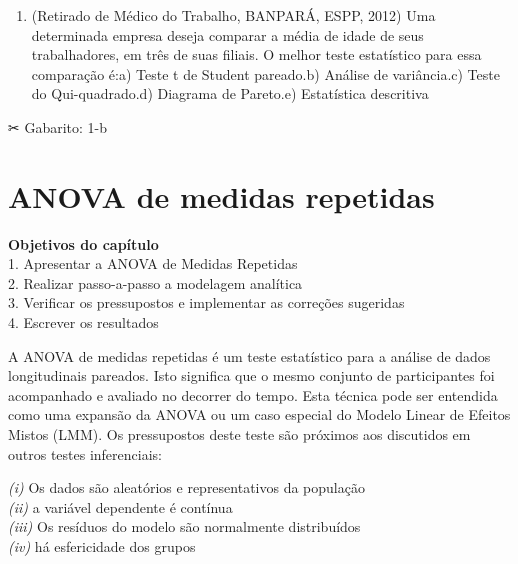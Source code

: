 \documentclass[
]{book}
\providecommand{\tightlist}{%
  \setlength{\itemsep}{0pt}\setlength{\parskip}{0pt}}
\begin{document}
\begin{question}

\begin{enumerate}
\def\labelenumi{\arabic{enumi}.}
\tightlist
\item
  (Retirado de Médico do Trabalho, BANPARÁ, ESPP, 2012) Uma determinada empresa deseja comparar a média de idade de seus trabalhadores, em três de suas filiais. O melhor teste estatístico para essa comparação é:a) Teste t de Student pareado.b) Análise de variância.c) Teste do Qui-quadrado.d) Diagrama de Pareto.e) Estatística descritiva
\end{enumerate}

\end{question}

\begin{mirror}

✂ Gabarito: 1-b

\end{mirror}

\hypertarget{anova-de-medidas-repetidas}{%
\chapter{ANOVA de medidas repetidas}\label{anova-de-medidas-repetidas}}

\begin{objectives}
\textbf{Objetivos do capítulo}\\
1. Apresentar a ANOVA de Medidas Repetidas\\
2. Realizar passo-a-passo a modelagem analítica\\
3. Verificar os pressupostos e implementar as correções sugeridas\\
4. Escrever os resultados
\end{objectives}

A ANOVA de medidas repetidas é um teste estatístico para a análise de dados longitudinais pareados. Isto significa que o mesmo conjunto de participantes foi acompanhado e avaliado no decorrer do tempo. Esta técnica pode ser entendida como uma expansão da ANOVA ou um caso especial do Modelo Linear de Efeitos Mistos (LMM). Os pressupostos deste teste são próximos aos discutidos em outros testes inferenciais:

\emph{(i)} Os dados são aleatórios e representativos da população\\
\emph{(ii)} a variável dependente é contínua\\
\emph{(iii)} Os resíduos do modelo são normalmente distribuídos\\
\emph{(iv)} há esfericidade dos grupos
\end{document}
